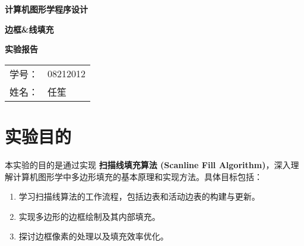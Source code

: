 \documentclass[a4paper,12pt]{article}
\begin{document}
\begin{titlepage}
    \centering
    \vspace*{3cm} %

    {\Huge \textbf{计算机图形学程序设计}\par}
    {\Huge \textbf{边框\&线填充}\par}
    \vspace{0.5cm}
    {\Huge \textbf{实验报告}\par}

    \vspace{8cm} %

    {\Large
    \begin{tabular}{rl}
        学号： & 08212012 \\
        姓名： & 任笙
    \end{tabular}
    \par}

    \vfill %
\end{titlepage}

\section{实验目的}
本实验的目的是通过实现 \textbf{扫描线填充算法 (Scanline Fill Algorithm)}，深入理解计算机图形学中多边形填充的基本原理和实现方法。具体目标包括：
\begin{enumerate}
    \item 学习扫描线算法的工作流程，包括边表和活动边表的构建与更新。
    \item 实现多边形的边框绘制及其内部填充。
    \item 探讨边框像素的处理以及填充效率优化。
\end{enumerate}
\end{document}
